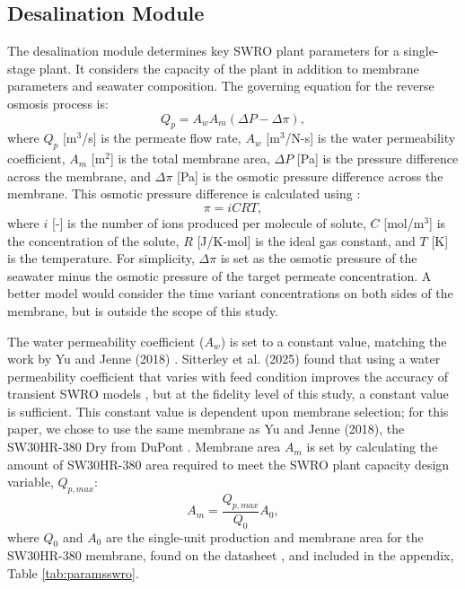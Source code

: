 \documentclass[a4paper,12pt]{elsarticle}
\begin{document}
\subsection{Desalination Module} \label{sec:desal}
The desalination module determines key SWRO plant parameters for a single-stage plant. It considers the capacity of the plant in addition to membrane parameters and seawater composition. The governing equation for the reverse osmosis process is:
\begin{equation}
    \label{eq:ro}
    Q_p = A_w A_m (\Delta P - \Delta \pi),
\end{equation}
\noindent where $Q_p$ [m$^3$/s] is the permeate flow rate, $A_w$ [m$^3$/N-s] is the water permeability coefficient, $A_m$ [m$^2$] is the total membrane area, $\Delta P$ [Pa] is the pressure difference across the membrane, and $\Delta \pi$ [Pa] is the osmotic pressure difference across the membrane. This osmotic pressure difference is calculated using \cite{separationprocesses}:
\begin{equation}
    \label{eq:osmotic_pressure}
    \pi = iCRT,
\end{equation}
\noindent where $i$ [-] is the number of ions produced per molecule of solute, $C$ [mol/m$^3$] is the concentration of the solute, $R$ [J/K-mol] is the ideal gas constant, and $T$ [K] is the temperature. For simplicity, $\Delta \pi$ is set as the osmotic pressure of the seawater minus the osmotic pressure of the target permeate concentration. A better model would consider the time variant concentrations on both sides of the membrane, but is outside the scope of this study.

The water permeability coefficient ($A_w$) is set to a constant value, matching the work by Yu and Jenne (2018) \cite{Yu2018}. Sitterley et al. (2025) found that using a water permeability coefficient that varies with feed condition improves the accuracy of transient SWRO models \cite{Kurby2025}, but at the fidelity level of this study, a constant value is sufficient. This constant value is dependent upon membrane selection; for this paper, we chose to use the same membrane as Yu and Jenne (2018), the SW30HR-380 Dry from DuPont \cite{SW30HR380}. Membrane area $A_m$ is set by calculating the amount of SW30HR-380 area required to meet the SWRO plant capacity design variable, $Q_{p,max}$:
\begin{equation}
    A_m = \frac{Q_{p,max}}{Q_0}A_0,
    \label{eq:membrane_area}
\end{equation} 
\noindent where $Q_0$ and $A_0$ are the single-unit production and membrane area for the SW30HR-380 membrane, found on the datasheet \cite{SW30HR380}, and included in the appendix, Table \ref{tab:paramsswro}.
\end{document}
